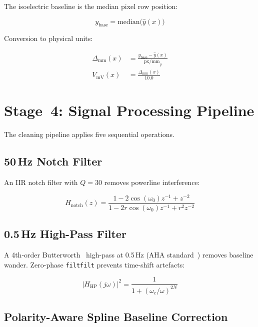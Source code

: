 \documentclass[conference]{IEEEtran}
\begin{document}
The isoelectric baseline is the median pixel row position:

\begin{equation}
  y_{\text{base}} = \text{median}\bigl(\hat{y}(x)\bigr)
\end{equation}

Conversion to physical units:

\begin{align}
  \Delta_{\text{mm}}(x) &= \frac{y_{\text{base}} - \hat{y}(x)}{\text{px/mm}_y} \\[4pt]
  V_{\text{mV}}(x)      &= \frac{\Delta_{\text{mm}}(x)}{10.0}
\end{align}

\section{Stage~4: Signal Processing Pipeline}

The cleaning pipeline applies five sequential operations.

\subsection{50\,Hz Notch Filter}

An IIR notch filter with $Q = 30$ removes powerline interference:

\begin{equation}
  H_{\text{notch}}(z) = \frac{1 - 2\cos(\omega_0)z^{-1} + z^{-2}}
                              {1 - 2r\cos(\omega_0)z^{-1} + r^2 z^{-2}}
\end{equation}

\subsection{0.5\,Hz High-Pass Filter}

A 4th-order Butterworth~\cite{butterworth1930} high-pass at 0.5\,Hz (AHA
standard~\cite{aha2007}) removes baseline wander. Zero-phase
\texttt{filtfilt} prevents time-shift artefacts:

\begin{equation}
  |H_{\text{HP}}(j\omega)|^2 = \frac{1}{1 + (\omega_c / \omega)^{2N}}
\end{equation}

\subsection{Polarity-Aware Spline Baseline Correction}
\end{document}
